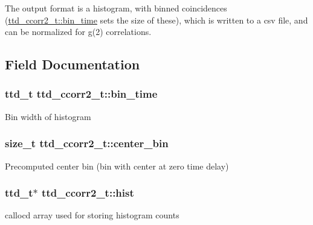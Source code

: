 The output format is a histogram, with binned coincidences (\hyperlink{structttd__ccorr2__t_ad92442a4ab2d08d4d15e6b32442a15eb}{ttd\+\_\+ccorr2\+\_\+t\+::bin\+\_\+time} sets the size of these), which is written to a csv file, and can be normalized for g(2) correlations. 

\subsection{Field Documentation}
\hypertarget{structttd__ccorr2__t_ad92442a4ab2d08d4d15e6b32442a15eb}{}
\subsubsection[{bin\+\_\+time}]{\setlength{\rightskip}{0pt plus 5cm}ttd\+\_\+t ttd\+\_\+ccorr2\+\_\+t\+::bin\+\_\+time}\label{structttd__ccorr2__t_ad92442a4ab2d08d4d15e6b32442a15eb}
Bin width of histogram \hypertarget{structttd__ccorr2__t_ade85728d8ba11808be8abbdb876d7d5d}{}
\subsubsection[{center\+\_\+bin}]{\setlength{\rightskip}{0pt plus 5cm}size\+\_\+t ttd\+\_\+ccorr2\+\_\+t\+::center\+\_\+bin}\label{structttd__ccorr2__t_ade85728d8ba11808be8abbdb876d7d5d}
Precomputed center bin (bin with center at zero time delay) \hypertarget{structttd__ccorr2__t_a6670bb2f511309d52c6c0cf9ccc9cf43}{}
\subsubsection[{hist}]{\setlength{\rightskip}{0pt plus 5cm}ttd\+\_\+t$\ast$ ttd\+\_\+ccorr2\+\_\+t\+::hist}\label{structttd__ccorr2__t_a6670bb2f511309d52c6c0cf9ccc9cf43}
calloc\textquotesingle{}d array used for storing histogram counts \hypertarget{structttd__ccorr2__t_a811a546cf1b2cf24a6c907c4917932ef}{}
